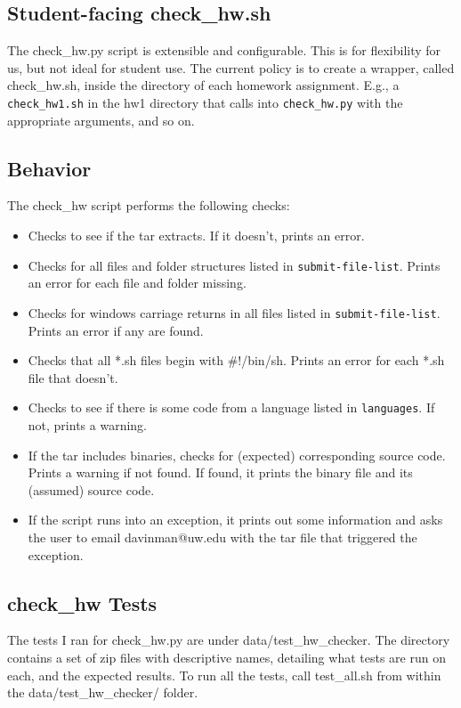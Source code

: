 \documentclass[12pt]{article}
\begin{document}
\subsection{Student-facing check\_hw.sh}

The check\_hw.py script is extensible and configurable. This is for flexibility for us, but not ideal for student use. The current policy is to create a wrapper, called check\_hw.sh, inside the directory of each homework assignment. E.g., a \texttt{check\_hw1.sh} in the hw1 directory that calls into \texttt{check\_hw.py} with the appropriate arguments, and so on.

\subsection{Behavior}

The check\_hw script performs the following checks:

\begin{itemize}
\item Checks to see if the tar extracts. If it doesn't, prints an error.
\item Checks for all files and folder structures listed in \texttt{submit-file-list}. Prints an error for each file and folder missing.
\item Checks for windows carriage returns in all files listed in \texttt{submit-file-list}. Prints an error if any are found.
\item Checks that all *.sh files begin with \#!/bin/sh. Prints an error for each *.sh file that doesn't.
\item Checks to see if there is some code from a language listed in \texttt{languages}. If not, prints a warning.
\item If the tar includes binaries, checks for (expected) corresponding source code. Prints a warning if not found. If found, it prints the binary file and its (assumed) source code.
\item If the script runs into an exception, it prints out some information and asks the user to email davinman@uw.edu with the tar file that triggered the exception.
\end{itemize}

\subsection{check\_hw Tests}

The tests I ran for check\_hw.py are under data/test\_hw\_checker. The directory contains a set of zip files with descriptive names, detailing what tests are run on each, and the expected results. To run all the tests, call test\_all.sh from within the data/test\_hw\_checker/ folder.
\end{document}
